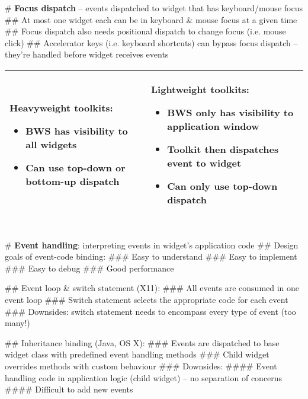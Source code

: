 \documentclass[11pt, oneside]{article}
\newenvironment{itemized}{\begin{itemize}[noitemsep, topsep=0pt, leftmargin=*]}{\end{itemize}}  %
\begin{document}
# \textbf{Focus dispatch} -- events dispatched to widget that has keyboard/mouse focus
## At most one widget each can be in keyboard \& mouse focus at a given time
## Focus dispatch also needs positional dispatch to change focus (i.e. mouse click)
## Accelerator keys (i.e. keyboard shortcuts) can bypass focus dispatch -- they're handled before widget receives events

\hspace{-2em}
\begin{tabular}{|l|l|}
\hline
\begin{minipage}[t]{0.45\textwidth}
\textbf{Heavyweight toolkits}:
    \begin{itemized}
    \item BWS has visibility to all widgets
    \item Can use top-down or bottom-up dispatch
    \end{itemized}
    \vspace*{0.5em}
\end{minipage}
&
\begin{minipage}[t]{0.45\textwidth}
\textbf{Lightweight toolkits}:
    \begin{itemized}
    \item BWS only has visibility to application window
    \item Toolkit then dispatches event to widget
    \item Can only use top-down dispatch
    \end{itemized}
    \vspace*{0.5em}
\end{minipage}  \\
\hline
\end{tabular} \\

# \textbf{Event handling}: interpreting events in widget's application code
## Design goals of event-code binding:
### Easy to understand
### Easy to implement
### Easy to debug
### Good performance

## Event loop \& switch statement (X11):
### All events are consumed in one event loop
### Switch statement selects the appropriate code for each event
### Downsides: switch statement needs to encompass every type of event (too many!)

## Inheritance binding (Java, OS X):
### Events are dispatched to base widget class with predefined event handling methods
### Child widget overrides methods with custom behaviour
### Downsides:
#### Event handling code in application logic (child widget) -- no separation of concerns
#### Difficult to add new events
\end{document}
